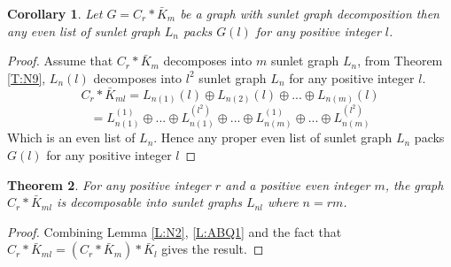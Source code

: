 \documentclass[12pt]{report}
\newtheorem{thm}{Theorem}[section]
\newtheorem{cor}[thm]{Corollary}
\begin{document}
\begin{cor}\label{C:N2}
Let $G=C_{r}*\bar{K}_{m}$ be a graph with sunlet graph decomposition
then any even list of sunlet graph $L_{n}$ packs $G\left( l\right) $
for any positive integer $l$.
\end{cor}
\begin{proof}
Assume that $C_{r}*\bar{K}_{m}$ decomposes into $m$ sunlet graph
$L_{n}$, from Theorem \ref{T:N9}, $L_{n}\left( l\right) $ decomposes
into $l^{2}$ sunlet graph $L_{n}$ for any positive integer $l$.
$$C_{r}*\bar{K}_{ml}=L_{n(1)}\left( l\right) \oplus L_{n(2)}\left( l\right)
\oplus ...\oplus L_{n(m)}\left( l\right)$$
 $$=L_{n(1)}^{(1)}\oplus
...\oplus L_{n(1)}^{(l^{2})}\oplus ...\oplus L_{n(m)}^{(1)}\oplus
...\oplus L_{n(m)}^{(l^{2})}$$
Which is an even list of $L_{n}$. Hence any proper even list of sunlet graph $%
L_{n}$ packs $G\left( l\right) $ for any positive integer $l$
\end{proof}
\begin{thm}\label{T:N10}
For any positive integer $r$ and a positive even integer $m$, the
graph $C_{r}*\bar{K}_{ml}$ is decomposable into sunlet graphs
$L_{nl}$ where $n=rm$.

\end{thm}
\begin{proof}
Combining Lemma \ref{L:N2}, \ref{L:ABQ1} and the fact that
$C_{r}*\bar{K}_{ml}=(C_r*\bar{K}_m)*\bar{K}_l$ gives the result.


\end{proof}
\end{document}
